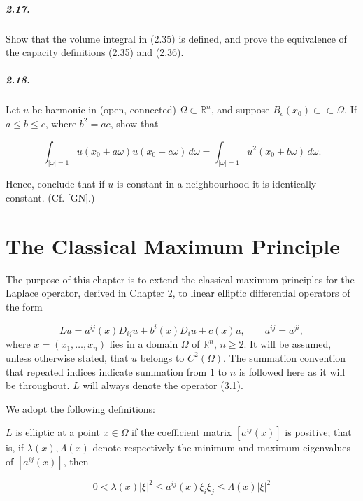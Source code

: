\paragraph{2.17.} Show that the volume integral in (2.35) is defined, and prove the equivalence of the capacity definitions (2.35) and (2.36).

\paragraph{2.18.} Let $u$ be harmonic in (open, connected) $\Omega \subset \mathbb{R}^n$, and suppose $B_c(x_0) \subset \subset \Omega$.
If $a \leq b \leq c$, where $b^2 = ac$, show that

\[
\int_{\lvert \omega\rvert = 1} u(x_0 + a\omega)u(x_0 + c\omega)\,d\omega
=
\int_{\lvert \omega\rvert = 1} u^2(x_0 + b\omega)\,d\omega.
\]

Hence, conclude that if $u$ is constant in a neighbourhood it is identically constant.
(Cf. [GN].)

\chapter{The Classical Maximum Principle}

The purpose of this chapter is to extend the classical maximum principles for the
Laplace operator, derived in Chapter 2, to linear elliptic differential operators of
the form

\begin{equation}\tag{3.1}
Lu=a^{ij}(x)D_{ij}u+b^i(x)D_i u+c(x)u,\qquad a^{ij}=a^{ji},
\end{equation}
where $x=(x_1,\dots,x_n)$ lies in a domain $\Omega$ of $\mathbb{R}^n$, $n\ge 2$. It will be assumed, unless
otherwise stated, that $u$ belongs to $C^2(\Omega)$. The summation convention that repeated
indices indicate summation from $1$ to $n$ is followed here as it will be throughout.
 $L$ will always denote the operator (3.1).

We adopt the following definitions:

$L$ is elliptic at a point $x\in\Omega$ if the coefficient matrix $[a^{ij}(x)]$ is positive; that is, if
$\lambda(x),\Lambda(x)$ denote respectively the minimum and maximum eigenvalues of $[a^{ij}(x)]$,
then

\begin{equation}\tag{3.2}
0<\lambda(x)|\xi|^2\le a^{ij}(x)\xi_i\xi_j\le \Lambda(x)|\xi|^2
\end{equation}

